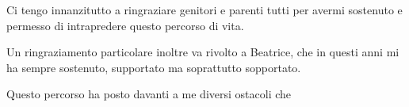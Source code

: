 
Ci tengo innanzitutto a ringraziare genitori e parenti tutti per avermi sostenuto e permesso di intrapredere questo percorso di vita.

Un ringraziamento particolare inoltre va rivolto a Beatrice, che in questi anni mi ha sempre sostenuto, supportato ma soprattutto sopportato.

Questo percorso ha posto davanti a me diversi ostacoli che 
